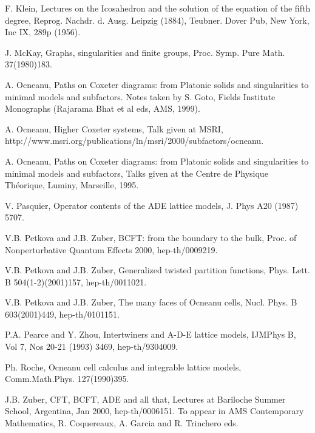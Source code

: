\documentclass[a4paper,11pt]{article}
\begin{document}
\begin{thebibliography}{99}
 F. Klein, Lectures on the Icosahedron and the
solution of the equation of the fifth degree, Reprog. Nachdr. d.
Ausg. Leipzig (1884), Teubner. Dover Pub, New York, Inc IX, 289p
(1956).

 J. McKay, Graphs, singularities and finite
groups, Proc. Symp. Pure Math. 37(1980)183.


 A. Ocneanu, Paths on Coxeter diagrams: from
Platonic solids and singularities to minimal models and subfactors.
Notes taken by S. Goto, Fields Institute Monographs (Rajarama Bhat et al eds, AMS, 1999).

 A. Ocneanu, Higher Coxeter systems, Talk given at
MSRI, http://www.msri.org/publications/ln/msri/2000/subfactors/ocneanu.


 A. Ocneanu, Paths on Coxeter
diagrams: from Platonic solids and singularities to minimal models
and subfactors, Talks given at the Centre de Physique Th\'eorique,
Luminy, Marseille, 1995.

 V. Pasquier, Operator contents of the ADE
lattice models, J. Phys A20 (1987) 5707.


 V.B. Petkova and J.B. Zuber, BCFT:
from the boundary to the bulk, Proc. of Nonperturbative Quantum
Effects 2000, hep-th/0009219.

 V.B. Petkova and J.B. Zuber, Generalized
twisted partition functions, Phys. Lett. B 504(1-2)(2001)157,
hep-th/0011021.

 V.B. Petkova and J.B. Zuber, The many faces
of Ocneanu cells, Nucl. Phys. B 603(2001)449, hep-th/0101151.

 P.A. Pearce and Y. Zhou, Intertwiners and 
A-D-E lattice models, IJMPhys B, Vol 7, Nos 20-21 (1993) 3469, hep-th/9304009.

 Ph. Roche, Ocneanu cell calculus and
integrable lattice models, Comm.Math.Phys. 127(1990)395.

 J.B. Zuber, CFT, BCFT, ADE and all that, 
Lectures at Bariloche Summer School, Argentina, Jan 2000, hep-th/0006151.
To appear in AMS Contemporary Mathematics, R. Coquereaux, A. Garcia
and R. Trinchero eds.










\end{thebibliography}
\end{document}
